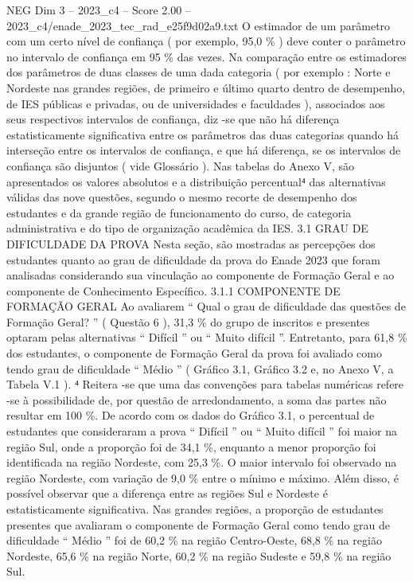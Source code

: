 \begin{textsample}{NEG Dim 3 – 2023\_c4 – Score 2.00 – 2023\_c4/enade\_2023\_tec\_rad\_e25f9d02a9.txt}
O estimador de um parâmetro com um certo nível de confiança ( por exemplo, 95,0 \% ) deve conter o parâmetro no intervalo de confiança em 95 \% das vezes.
Na comparação entre os estimadores dos parâmetros de duas classes de uma dada categoria ( por exemplo : Norte e Nordeste nas grandes regiões, de primeiro e último quarto dentro de desempenho, de IES públicas e privadas, ou de universidades e faculdades ), associados aos seus respectivos intervalos de confiança, diz -se que não há diferença estatisticamente significativa entre os parâmetros das duas categorias quando há interseção entre os intervalos de confiança, e que há diferença, se os intervalos de confiança são disjuntos ( vide Glossário ).
Nas tabelas do Anexo V, são apresentados os valores absolutos e a distribuição percentual⁴ das alternativas válidas das nove questões, segundo o mesmo recorte de desempenho dos estudantes e da grande região de funcionamento do curso, de categoria administrativa e do tipo de organização acadêmica da IES. 3.1 GRAU DE DIFICULDADE DA PROVA Nesta seção, são mostradas as percepções dos estudantes quanto ao grau de dificuldade da prova do Enade 2023 que foram analisadas considerando sua vinculação ao componente de Formação Geral e ao componente de Conhecimento Específico. 3.1.1 COMPONENTE DE FORMAÇÃO GERAL Ao avaliarem “ Qual o grau de dificuldade das questões de Formação Geral? ” ( Questão 6 ), 31,3 \% do grupo de inscritos e presentes optaram pelas alternativas “ Difícil ” ou “ Muito difícil ”.
Entretanto, para 61,8 \% dos estudantes, o componente de Formação Geral da prova foi avaliado como tendo grau de dificuldade “ Médio ” ( Gráfico 3.1, Gráfico 3.2 e, no Anexo V, a Tabela V.1 ). ⁴ Reitera -se que uma das convenções para tabelas numéricas refere -se à possibilidade de, por questão de arredondamento, a soma das partes não resultar em 100 \%.
De acordo com os dados do Gráfico 3.1, o percentual de estudantes que consideraram a prova “ Difícil ” ou “ Muito difícil ” foi maior na região Sul, onde a proporção foi de 34,1 \%, enquanto a menor proporção foi identificada na região Nordeste, com 25,3 \%.
O maior intervalo foi observado na região Nordeste, com variação de 9,0 \% entre o mínimo e máximo.
Além disso, é possível observar que a diferença entre as regiões Sul e Nordeste é estatisticamente significativa.
Nas grandes regiões, a proporção de estudantes presentes que avaliaram o componente de Formação Geral como tendo grau de dificuldade “ Médio ” foi de 60,2 \% na região Centro-Oeste, 68,8 \% na região Nordeste, 65,6 \% na região Norte, 60,2 \% na região Sudeste e 59,8 \% na região Sul.

\end{textsample}
